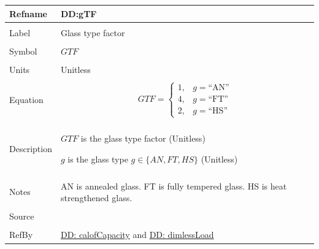 \documentclass[12pt]{article}
\begin{document}
\noindent \begin{minipage}{\textwidth}
          \begin{tabular}{>{\raggedright}p{}>{\raggedright\arraybackslash}p{}}
          \toprule \textbf{Refname} & \textbf{DD:gTF}
          \label{DD:gTF}
          \\ \midrule \\
          Label & Glass type factor
          \\ \midrule \\
          Symbol & $GTF$
          \\ \midrule \\
          Units & Unitless
          \\ \midrule \\
          Equation & \begin{displaymath}
                     GTF=\begin{cases}
                         1, & g=\text{``AN''}\\
4, & g=\text{``FT''}\\
2, & g=\text{``HS''}
                         \end{cases}
                     \end{displaymath}
          \\ \midrule \\
          Description & \begin{symbDescription}
                        \item{$GTF$ is the glass type factor (Unitless)}
                        \item{$g$ is the glass type $g\in{}\{AN,FT,HS\}$ (Unitless)}
                        \end{symbDescription}
          \\ \midrule \\
          Notes & AN is annealed glass.
                  FT is fully tempered glass.
                  HS is heat strengthened glass.
          \\ \midrule \\
          Source & \cite{astm2009}
          \\ \midrule \\
          RefBy & \hyperref[DD:calofCapacity]{DD: calofCapacity} and \hyperref[DD:dimlessLoad]{DD: dimlessLoad}
          \\ \bottomrule
          \end{tabular}
          \end{minipage}
\par~
\end{document}
